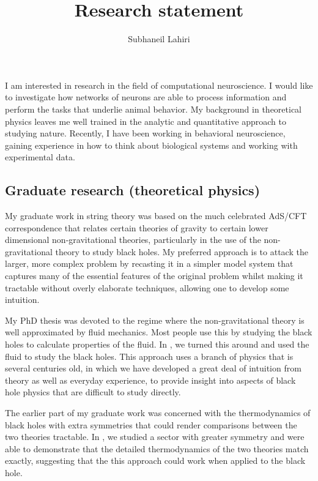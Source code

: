 \documentclass[11pt]{article}
\title{Research statement}
\author{Subhaneil Lahiri}
\begin{document}
\maketitle







I am interested in research in the field of computational neuroscience. I would like to investigate how networks of neurons are able to process information and perform the tasks that underlie animal behavior. My background in theoretical physics leaves me well trained in the analytic and quantitative approach to studying nature. Recently, I have been working in behavioral neuroscience, gaining experience in how to think about biological systems and working with experimental data.

\subsection*{Graduate research (theoretical physics)}

My graduate work in string theory was based on the much celebrated AdS/CFT correspondence that relates certain theories of gravity to certain lower dimensional non-gravitational theories, particularly in the use of the non-gravitational theory to study black holes. My preferred approach is to attack the larger, more complex problem by recasting it in a simpler model system that captures many of the essential features of the original problem whilst making it tractable without overly elaborate techniques, allowing one to develop some intuition.

My PhD thesis was devoted to the regime where the non-gravitational theory is well approximated by fluid mechanics. Most people use this by studying the black holes to calculate properties of the fluid. In \cite{Lahiri:2007ae,Bhattacharyya:2007vs,Bhattacharya:2009gm}, we turned this around and used the fluid to study the black holes. This approach uses a branch of physics that is several centuries old, in which we have developed a great deal of intuition from theory as well as everyday experience, to provide insight into aspects of black hole physics that are difficult to study directly.

The earlier part of my graduate work was concerned with the thermodynamics of black holes with extra symmetries that could render comparisons between the two theories tractable. In \cite{Biswas:2006tj}, we studied a sector with greater symmetry and were able to demonstrate that the detailed thermodynamics of the two theories match exactly, suggesting that the this approach could work when applied to the black hole.
\end{document}
